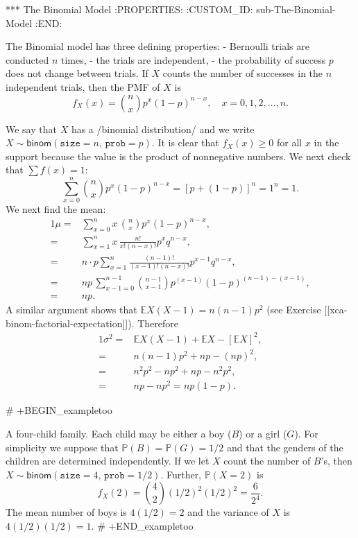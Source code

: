 *** The Binomial Model
:PROPERTIES:
:CUSTOM_ID: sub-The-Binomial-Model
:END:

The Binomial model has three defining properties:
- Bernoulli trials are conducted \(n\) times,
- the trials are independent,
- the probability of success \(p\) does not change between trials.
If \(X\) counts the number of successes in the \(n\) independent
trials, then the PMF of \(X\) is 
\begin{equation}
f_{X}(x)={n \choose x}p^{x}(1-p)^{n-x},\quad x=0,1,2,\ldots,n.
\end{equation}

We say that \(X\) has a /binomial distribution/ and we write
\(X\sim\mathsf{binom}(\mathtt{size}=n,\,\mathtt{prob}=p)\). It is
clear that \(f_{X}(x)\geq0\) for all \(x\) in the support because the
value is the product of nonnegative numbers. We next check that \(\sum
f(x)=1\): \[ \sum_{x = 0}^{n}{n \choose x} p^{x} (1 - p)^{n - x} =
[p + (1 - p)]^{n} = 1^{n} = 1.  \] We next find the mean:
\begin{alignat*}{1}
\mu= & \sum_{x=0}^{n}x\,{n \choose x}p^{x}(1-p)^{n-x},\\
= & \sum_{x=1}^{n}x\,\frac{n!}{x!(n-x)!}p^{x}q^{n-x},\\
= & n\cdot p\sum_{x=1}^{n}\frac{(n-1)!}{(x-1)!(n-x)!}p^{x-1}q^{n-x},\\
= & np\,\sum_{x-1=0}^{n-1}{n-1 \choose x-1}p^{(x-1)}(1-p)^{(n-1)-(x-1)},\\
= & np.
\end{alignat*}
A similar argument shows that \(\mathbb{E} X(X - 1) = n(n - 1)p^{2}\) (see
Exercise [[xca-binom-factorial-expectation]]). Therefore
\begin{alignat*}{1}
\sigma^{2}= & \mathbb{E} X(X-1)+\mathbb{E} X-[\mathbb{E} X]^{2},\\
= & n(n-1)p^{2}+np-(np)^{2},\\
= & n^{2}p^{2}-np^{2}+np-n^{2}p^{2},\\
= & np-np^{2}=np(1-p).
\end{alignat*}

# +BEGIN_exampletoo

A four-child family. Each child may be either a boy (\(B\)) or a girl
(\(G\)). For simplicity we suppose that
\(\mathbb{P}(B)=\mathbb{P}(G)=1/2\) and that the genders of the
children are determined independently. If we let \(X\) count the
number of \(B\)'s, then
\(X\sim\mathsf{binom}(\mathtt{size}=4,\,\mathtt{prob}=1/2)\). Further,
\(\mathbb{P}(X=2)\) is
\[
f_{X}(2)={4 \choose 2}(1/2)^{2}(1/2)^{2}=\frac{6}{2^{4}}.
\]
The mean number of boys is \(4(1/2)=2\) and the variance of \(X\) is
\(4(1/2)(1/2)=1\).
# +END_exampletoo

